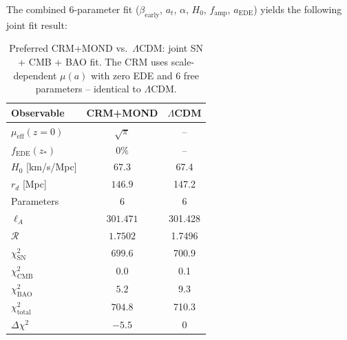 \documentclass[aps,prd,twocolumn,superscriptaddress,nofootinbib]{revtex4-2}
\begin{document}
The combined 6-parameter fit ($\beta_{\mathrm{early}}$, $a_t$, $\alpha$, $H_0$, $f_{\mathrm{amp}}$, $a_{\mathrm{EDE}}$) yields the following joint fit result:

\begin{table}[H]
\centering
\caption{Preferred CRM+MOND vs.\ $\Lambda$CDM: joint SN + CMB + BAO fit. The CRM uses scale-dependent $\mu(a)$ with zero EDE and 6 free parameters -- identical to $\Lambda$CDM.}
\label{tab:combined_fit}
\begin{tabular}{lcc}
\toprule
\textbf{Observable} & \textbf{CRM+MOND} & \textbf{$\Lambda$CDM} \\
\midrule
$\mu_{\mathrm{eff}}(z{=}0)$ & $\sqrt{\pi}$ & -- \\
$f_{\mathrm{EDE}}(z_*)$ & $0\%$ & -- \\
$H_0$ [km/s/Mpc] & $67.3$ & 67.4 \\
$r_d$ [Mpc] & $146.9$ & 147.2 \\
Parameters & $6$ & 6 \\
\midrule
$\ell_A$ & $301.471$ & 301.428 \\
$\mathcal{R}$ & $1.7502$ & 1.7496 \\
\midrule
$\chi^2_{\mathrm{SN}}$ & $699.6$ & 700.9 \\
$\chi^2_{\mathrm{CMB}}$ & $0.0$ & 0.1 \\
$\chi^2_{\mathrm{BAO}}$ & $5.2$ & 9.3 \\
\midrule
$\chi^2_{\mathrm{total}}$ & $704.8$ & 710.3 \\
$\Delta\chi^2$ & $-5.5$ & 0 \\
\bottomrule
\end{tabular}
\end{table}
\end{document}
